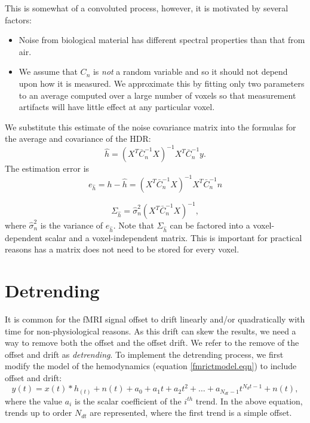 \documentclass[12pt]{article}
\begin{document}
This is somewhat of a convoluted process, however, it is motivated
by several factors: 
\begin{itemize}
\item Noise from biological material has different spectral properties
than that from air.
\item We assume that $C_n$ is {\em not} a random variable and so it
should not depend upon how it is measured.  We approximate this by
fitting only two parameters to an average computed over a large number
of voxels so that measurement artifacts will have little effect at any
particular voxel.
\end{itemize}

We substitute this estimate of the noise covariance matrix into
the formulas for the average and covariance of the HDR:
\begin{equation}
\hat{h} = (X^T \bar{C}_{n}^{-1} X)^{-1} X^T \bar{C}^{-1}_n y.
\label{hhat.eqn}
\end{equation}
The estimation error is 
\begin{equation}
e_{\hat{h}} = h - \hat{h} = (X^T \bar{C}_{n}^{-1} X)^{-1} X^T 
   \bar{C}^{-1}_n n
\label{hhaterr.eqn}
\end{equation}

\begin{equation}
\Sigma_{\hat{h}} = \hat{\sigma}_n^2 (X^T \bar{C}_{n}^{-1} X)^{-1},
\end{equation}
where $\hat{\sigma}_n^2$ is the variance of $e_{\hat{h}}$.
Note that $\Sigma_{\hat{h}}$ can be factored into a voxel-dependent
scalar and a voxel-independent matrix.  This is important for 
practical reasons has a matrix does not need to be stored
for every voxel. 

\section{Detrending}

It is common for the fMRI signal offset to drift linearly and/or
quadratically with time for non-physiological reasons.  As this drift
can skew the results, we need a way to remove both the offset and the
offset drift.  We refer to the remove of the offset and drift as {\em
detrending}.  To implement the detrending process, we first modify the
model of the hemodynamics (equation \ref{fmrictmodel.eqn}) to include
offset and drift:
\begin{equation}
y(t) = x(t)*h_(t) + n(t) + a_0 + a_1 t + a_2 t^2 + \ldots +
a_{N_{dt}-1} t^{N_{d}t-1} +n(t),
\label{fmrictdrift.eqn}
\end{equation}
where the value $a_i$ is the scalar coefficient of the $i^{th}$ trend.
In the above equation, trends up to order $N_{dt}$ are represented,
where the first trend is a simple offset.  
\end{document}
